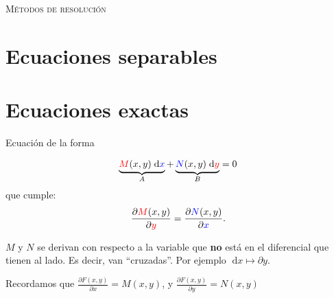 \documentclass[a4paper]{article}
\newcommand{\dif}[1]{\;\mathrm{d}#1}
\begin{document}
\begin{raggedleft}
    \Large
    \textsc{Métodos de resolución}
\end{raggedleft}

\section{Ecuaciones separables}
\section{Ecuaciones exactas}
Ecuación de la forma 

\begin{equation}
    \label{eq:forma-exacta}
    \underbrace{{\color{red}M}(x,y) \dif{{\color{blue}x}}}_{A} + \underbrace{{\color{blue}N}(x,y) \dif{{\color{red} y}}}_{B} = 0  
\end{equation}
que cumple:
\begin{equation*}
    \frac{\partial {\color{red}M}(x,y)}{\partial {\color{red}y }} = \frac{\partial {\color{blue} N}(x,y)}{\partial {\color{blue} x}}.
\end{equation*}

\begin{obs}
    $M$ y $N$ se derivan con respecto a la variable que \textbf{no} está en el diferencial que tienen al lado.
    Es decir, van ``cruzadas''.
    Por ejemplo $\dif{x} \mapsto \partial y$.
\end{obs}

Recordamos que $\displaystyle \frac{\partial F(x,y)}{\partial x} = M(x,y)$, y $\displaystyle \frac{\partial F(x,y)}{\partial y} = N(x,y)$
\end{document}
